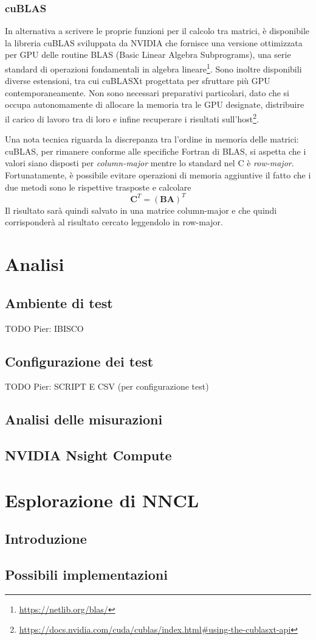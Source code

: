 \documentclass[a4paper]{article}
\begin{document}
\subsubsection{cuBLAS}
In alternativa a scrivere le proprie funzioni per il calcolo tra matrici, è disponibile la libreria cuBLAS sviluppata da NVIDIA che fornisce una versione ottimizzata per GPU delle routine BLAS (Basic Linear Algebra Subprograms), una serie standard di operazioni fondamentali in algebra lineare\footnote{\url{https://netlib.org/blas/}}. Sono inoltre disponibili diverse estensioni, tra cui cuBLASXt progettata per sfruttare più GPU contemporaneamente. Non sono necessari preparativi particolari, dato che si occupa autonomamente di allocare la memoria tra le GPU designate, distribuire il carico di lavoro tra di loro e infine recuperare i risultati sull'host\footnote{\url{https://docs.nvidia.com/cuda/cublas/index.html\#using-the-cublasxt-api}}.

Una nota tecnica riguarda la discrepanza tra l'ordine in memoria delle matrici: cuBLAS, per rimanere conforme alle specifiche Fortran di BLAS, si aspetta che i valori siano disposti per \textit{column-major} mentre lo standard nel C è \textit{row-major}. Fortunatamente, è possibile evitare operazioni di memoria aggiuntive il fatto che i due metodi sono le rispettive trasposte e calcolare
$$
    \mathbf{C}^T=(\mathbf{B}\mathbf{A})^T
$$
Il risultato sarà quindi salvato in una matrice column-major e che quindi corrisponderà al risultato cercato leggendolo in row-major.

\section{Analisi}

\subsection{Ambiente di test}

TODO Pier: IBISCO

\subsection{Configurazione dei test}

TODO Pier: SCRIPT E CSV (per configurazione test)

\subsection{Analisi delle misurazioni}

\subsection{NVIDIA Nsight Compute}

\section{Esplorazione di NNCL}

\subsection{Introduzione}

\subsection{Possibili implementazioni}

\printbibliography
\end{document}
